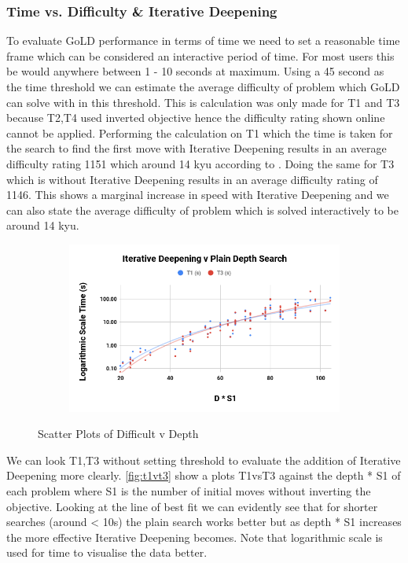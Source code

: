 \documentclass{l4proj}
\begin{document}
\subsubsection{Time vs. Difficulty \& Iterative Deepening}
To evaluate GoLD performance in terms of time we need to set a reasonable time frame which can be considered an interactive period of time. For most users this be would anywhere between 1 - 10 seconds at maximum. Using a 45 second as the time threshold we can estimate the average difficulty of problem which GoLD can solve with in this threshold. This is calculation was only made for T1 and T3 because T2,T4 used inverted objective hence the difficulty rating shown online cannot be applied. Performing the calculation on T1 which the time is taken for the search to find the first move with Iterative Deepening results in an average difficulty rating 1151 which around 14 kyu according to \cite{GoProblems}. Doing the same for T3 which is without Iterative Deepening results in an average difficulty rating of 1146.  This shows a marginal increase in speed with Iterative Deepening and we can also state the average difficulty of problem which is solved interactively to be around 14 kyu.



\begin{figure}[!h]
\centering
\begin{subfigure}[b]{\textwidth}
\centering
\includegraphics[width=\textwidth]{edvd/t1vt3.png}
\end{subfigure}
\caption{Scatter Plots of Difficult v Depth}
\label{fig:t1vt3}
\end{figure}




We can look T1,T3 without setting threshold to evaluate the addition of Iterative Deepening more clearly. \autoref{fig:t1vt3} show a plots T1vsT3 against the depth * S1 of each problem where S1 is the number of initial moves without inverting the objective. Looking at the line of best fit we can evidently see that for shorter searches (around < 10s) the plain search works better but as depth * S1 increases the more effective Iterative Deepening becomes. Note that logarithmic scale is used for time to visualise the data better.
\end{document}
